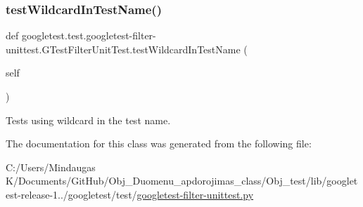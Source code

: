 \subsubsection{\texorpdfstring{testWildcardInTestName()}{testWildcardInTestName()}}
{\footnotesize\ttfamily def googletest.\+test.\+googletest-\/filter-\/unittest.\+G\+Test\+Filter\+Unit\+Test.\+test\+Wildcard\+In\+Test\+Name (\begin{DoxyParamCaption}\item[{}]{self }\end{DoxyParamCaption})}

\begin{DoxyVerb}Tests using wildcard in the test name.\end{DoxyVerb}
 

The documentation for this class was generated from the following file\+:\begin{DoxyCompactItemize}
\item 
C\+:/\+Users/\+Mindaugas K/\+Documents/\+Git\+Hub/\+Obj\+\_\+\+Duomenu\+\_\+apdorojimas\+\_\+class/\+Obj\+\_\+test/lib/googletest-\/release-\/1../googletest/test/\mbox{\hyperlink{_obj__test_2lib_2googletest-release-1_88_81_2googletest_2test_2googletest-filter-unittest_8py}{googletest-\/filter-\/unittest.\+py}}\end{DoxyCompactItemize}
